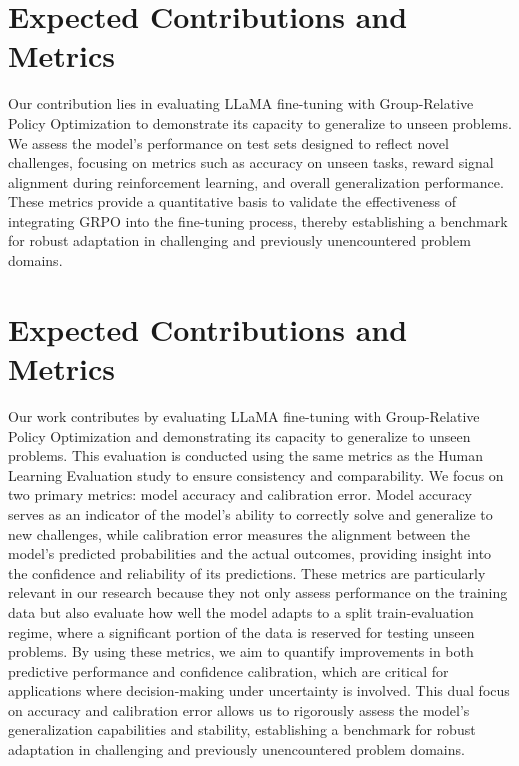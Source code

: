 \documentclass{svproc}
\begin{document}


\section{Expected Contributions and Metrics}

Our contribution lies in evaluating LLaMA fine-tuning with Group-Relative Policy Optimization to demonstrate its capacity to generalize to unseen problems. We assess the model's performance on test sets designed to reflect novel challenges, focusing on metrics such as accuracy on unseen tasks, reward signal alignment during reinforcement learning, and overall generalization performance. These metrics provide a quantitative basis to validate the effectiveness of integrating GRPO into the fine-tuning process, thereby establishing a benchmark for robust adaptation in challenging and previously unencountered problem domains.

\section{Expected Contributions and Metrics}

Our work contributes by evaluating LLaMA fine-tuning with Group-Relative Policy Optimization and demonstrating its capacity to generalize to unseen problems. This evaluation is conducted using the same metrics as the Human Learning Evaluation study to ensure consistency and comparability. We focus on two primary metrics: model accuracy and calibration error. Model accuracy serves as an indicator of the model's ability to correctly solve and generalize to new challenges, while calibration error measures the alignment between the model's predicted probabilities and the actual outcomes, providing insight into the confidence and reliability of its predictions. These metrics are particularly relevant in our research because they not only assess performance on the training data but also evaluate how well the model adapts to a split train-evaluation regime, where a significant portion of the data is reserved for testing unseen problems. By using these metrics, we aim to quantify improvements in both predictive performance and confidence calibration, which are critical for applications where decision-making under uncertainty is involved. This dual focus on accuracy and calibration error allows us to rigorously assess the model’s generalization capabilities and stability, establishing a benchmark for robust adaptation in challenging and previously unencountered problem domains.
\end{document}
